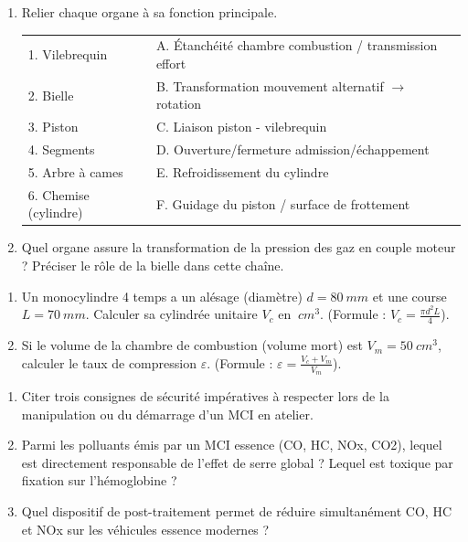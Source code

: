 \documentclass[11pt]{article}
\begin{document}
\begin{exercice}
\begin{enumerate}
    \item Relier chaque organe à sa fonction principale.
    \begin{tabular}{ll}
    1. Vilebrequin & A. Étanchéité chambre combustion / transmission effort \\
    2. Bielle & B. Transformation mouvement alternatif $\rightarrow$ rotation \\
    3. Piston & C. Liaison piston - vilebrequin \\
    4. Segments & D. Ouverture/fermeture admission/échappement \\
    5. Arbre à cames & E. Refroidissement du cylindre \\
    6. Chemise (cylindre) & F. Guidage du piston / surface de frottement \\
    \end{tabular}
    \item Quel organe assure la transformation de la pression des gaz en couple moteur ? Préciser le rôle de la bielle dans cette chaîne.
\end{enumerate}
\end{exercice}

\begin{exercice}
\begin{enumerate}
    \item Un monocylindre 4 temps a un alésage (diamètre) $d = \SI{80}{mm}$ et une course $L = \SI{70}{mm}$. Calculer sa cylindrée unitaire $V_c$ en $\SI{}{cm^3}$. (Formule : $V_c = \frac{\pi d^2 L}{4}$).
    \item Si le volume de la chambre de combustion (volume mort) est $V_m = \SI{50}{cm^3}$, calculer le taux de compression $\varepsilon$. (Formule : $\varepsilon = \frac{V_c + V_m}{V_m}$).
\end{enumerate}
\end{exercice}

\begin{exercice}
\begin{enumerate}
    \item Citer trois consignes de sécurité impératives à respecter lors de la manipulation ou du démarrage d'un MCI en atelier.
    \item Parmi les polluants émis par un MCI essence (CO, HC, NOx, CO2), lequel est directement responsable de l'effet de serre global ? Lequel est toxique par fixation sur l'hémoglobine ?
    \item Quel dispositif de post-traitement permet de réduire simultanément CO, HC et NOx sur les véhicules essence modernes ?
\end{enumerate}
\end{exercice}
\end{document}
